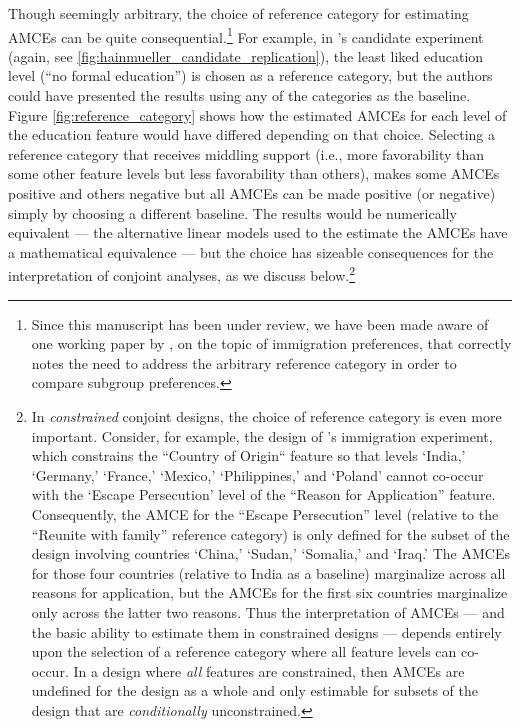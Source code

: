 \documentclass[a4paper,12pt]{article}\usepackage[]{graphicx}\usepackage[]{color}
\begin{document}
Though seemingly arbitrary, the choice of reference category for estimating AMCEs can be quite consequential.\footnote{Since this manuscript has been under review, we have been made aware of one working paper by \citet{ClaytonFerwerdaHoriuchi2018}, on the topic of immigration preferences, that correctly notes the need to address the arbitrary reference category in order to compare subgroup preferences.} For example, in \citeauthor{HainmuellerHopkinsYamamoto2014}'s candidate experiment (again, see \ref{fig:hainmueller_candidate_replication}), the least liked education level (``no formal education'') is chosen as a reference category, but the authors could have presented the results using any of the categories as the baseline. Figure \ref{fig:reference_category} shows how the estimated AMCEs for each level of the education feature would have differed depending on that choice. Selecting a reference category that receives middling support (i.e., more favorability than some other feature levels but less favorability than others), makes some AMCEs positive and others negative but all AMCEs can be made positive (or negative) simply by choosing a different baseline. The results would be numerically equivalent --- the alternative linear models used to the estimate the AMCEs have a mathematical equivalence --- but the choice has sizeable consequences for the interpretation of conjoint analyses, as we discuss below.\footnote{In \textit{constrained} conjoint designs, the choice of reference category is even more important. Consider, for example, the design of \citeauthor{HainmuellerHopkinsYamamoto2014}'s immigration experiment, which constrains the ``Country of Origin`` feature so that levels `India,' `Germany,' `France,' `Mexico,' `Philippines,' and `Poland' cannot co-occur with the `Escape Persecution' level of the ``Reason for Application'' feature. Consequently, the AMCE for the ``Escape Persecution'' level (relative to the  ``Reunite with family'' reference category) is only defined for the subset of the design involving countries `China,' `Sudan,' `Somalia,' and `Iraq.' The AMCEs for those four countries (relative to India as a baseline) marginalize across all reasons for application, but the AMCEs for the first six countries marginalize only across the latter two reasons. Thus the interpretation of AMCEs --- and the basic ability to estimate them in constrained designs --- depends entirely upon the selection of a reference category where all feature levels can co-occur. In a design where \textit{all} features are constrained, then AMCEs are undefined for the design as a whole and only estimable for subsets of the design that are \textit{conditionally} unconstrained.}
\end{document}
